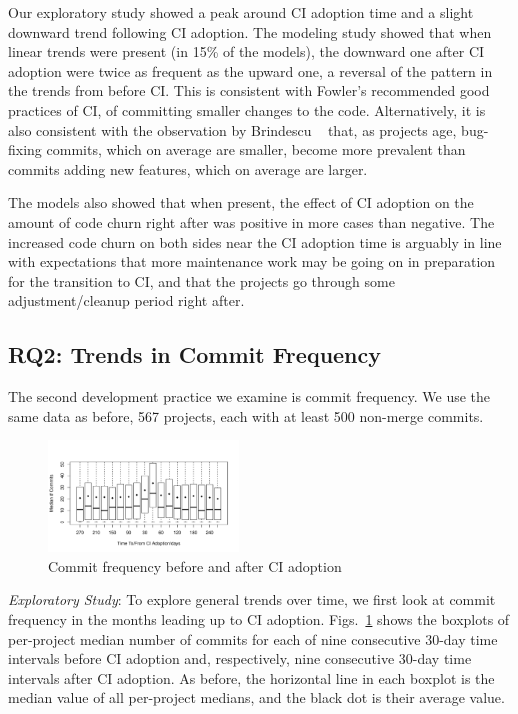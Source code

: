 Our exploratory study showed a peak around CI adoption time and a slight 
downward trend following CI adoption.
The modeling study showed that when linear trends were present (in 15\% 
of the models), the downward one after CI adoption were twice as frequent 
as the upward one, a reversal of the pattern in the trends from before CI.
This is consistent with Fowler's recommended good practices of CI, of 
committing smaller changes to the code.
Alternatively, it is also consistent with the observation by Brindescu 
\etal~\cite{brindescu2014centralized} that, as projects age, bug-fixing 
commits, which on average are smaller, become more prevalent than 
commits adding new features, which on average are larger.

The models also showed that when present, the effect of CI adoption on the 
amount of code churn right after was positive in more cases than negative.
The increased code churn on both sides near the CI adoption time is 
arguably in line with expectations that more maintenance work may be 
going on in preparation for the transition to CI, and that the projects go 
through some adjustment/cleanup period right after.


\subsection{RQ2: Trends in Commit Frequency}

The second development practice we examine is commit frequency.
We use the same data as before, 567 projects, each with at least 500 
non-merge commits.

\begin{figure}[!t]
\centering
\includegraphics[width=0.45\textwidth, clip=true, trim=0 15 15 50]{numbercommits.pdf}
\caption{Commit frequency before and after CI adoption}
\label{Fig:NumberCommits}
\end{figure}

\smallskip\noindent \emph{Exploratory Study}: 
To explore general trends over time, we first look at commit frequency in 
the months leading up to CI adoption.
Figs.~\ref{Fig:NumberCommits} shows the boxplots of per-project median 
number of commits for each of nine consecutive 30-day time intervals 
before CI adoption and, respectively, nine consecutive 30-day time intervals 
after CI adoption.
As before, the horizontal line in each boxplot is the median value of all 
per-project medians, and the black dot is their average value.

